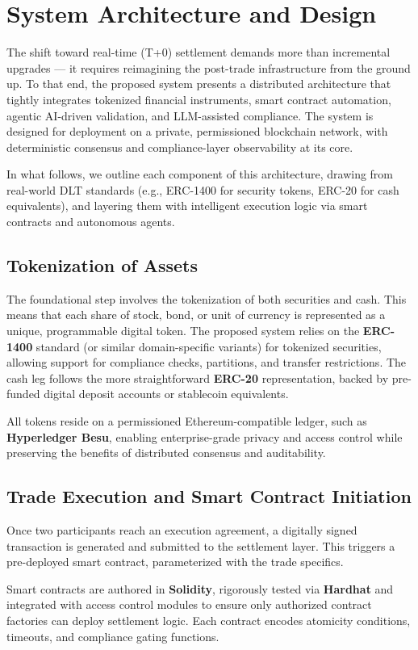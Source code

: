 \documentclass[conference]{IEEEtran}
\begin{document}
\section{System Architecture and Design}
The shift toward real-time (T+0) settlement demands more than incremental upgrades — it requires reimagining the post-trade infrastructure from the ground up. To that end, the proposed system presents a distributed architecture that tightly integrates tokenized financial instruments, smart contract automation, agentic AI-driven validation, and LLM-assisted compliance. The system is designed for deployment on a private, permissioned blockchain network, with deterministic consensus and compliance-layer observability at its core.

In what follows, we outline each component of this architecture, drawing from real-world DLT standards (e.g., ERC-1400 for security tokens, ERC-20 for cash equivalents), and layering them with intelligent execution logic via smart contracts and autonomous agents.
\subsection{Tokenization of Assets}
The foundational step involves the tokenization of both securities and cash. This means that each share of stock, bond, or unit of currency is represented as a unique, programmable digital token. The proposed system relies on the \textbf{ERC-1400} standard (or similar domain-specific variants) for tokenized securities, allowing support for compliance checks, partitions, and transfer restrictions. The cash leg follows the more straightforward \textbf{ERC-20} representation, backed by pre-funded digital deposit accounts or stablecoin equivalents.

All tokens reside on a permissioned Ethereum-compatible ledger, such as \textbf{Hyperledger Besu}, enabling enterprise-grade privacy and access control while preserving the benefits of distributed consensus and auditability.
\subsection{Trade Execution and Smart Contract Initiation}
Once two participants reach an execution agreement, a digitally signed transaction is generated and submitted to the settlement layer. This triggers a pre-deployed smart contract, parameterized with the trade specifics.

Smart contracts are authored in \textbf{Solidity}, rigorously tested via \textbf{Hardhat} and integrated with access control modules to ensure only authorized contract factories can deploy settlement logic. Each contract encodes atomicity conditions, timeouts, and compliance gating functions.
\end{document}

